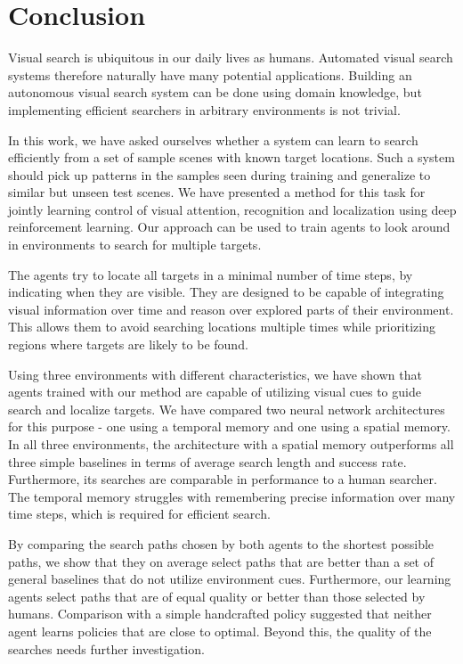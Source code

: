\chapter{Conclusion}
\label{cha:conclusion}

Visual search is ubiquitous in our daily lives as humans.
Automated visual search systems therefore naturally have many potential applications.
Building an autonomous visual search system can be done using domain knowledge, but implementing efficient searchers in arbitrary environments is not trivial.

In this work, we have asked ourselves whether a system can learn to search efficiently from a set of sample scenes with known target locations.
Such a system should pick up patterns in the samples seen during training and generalize to similar but unseen test scenes.
We have presented a method for this task for jointly learning control of visual attention, recognition and localization using deep reinforcement learning.
Our approach can be used to train agents to look around in environments to search for multiple targets.

The agents try to locate all targets in a minimal number of time steps, by indicating when they are visible.
They are designed to be capable of integrating visual information over time and reason over explored parts of their environment.
This allows them to avoid searching locations multiple times while prioritizing regions where targets are likely to be found.

Using three environments with different characteristics, we have shown that agents trained with our method are capable of utilizing visual cues to guide search and localize targets.
We have compared two neural network architectures for this purpose - one using a temporal memory and one using a spatial memory.
In all three environments, the architecture with a spatial memory outperforms all three simple baselines in terms of average search length and success rate.
Furthermore, its searches are comparable in performance to a human searcher.
The temporal memory struggles with remembering precise information over many time steps, which is required for efficient search.

By comparing the search paths chosen by both agents to the shortest possible paths, we show that they on average select paths that are better than a set of general baselines that do not utilize environment cues.
Furthermore, our learning agents select paths that are of equal quality or better than those selected by humans.
Comparison with a simple handcrafted policy suggested that neither agent learns policies that are close to optimal.
Beyond this, the quality of the searches needs further investigation.


